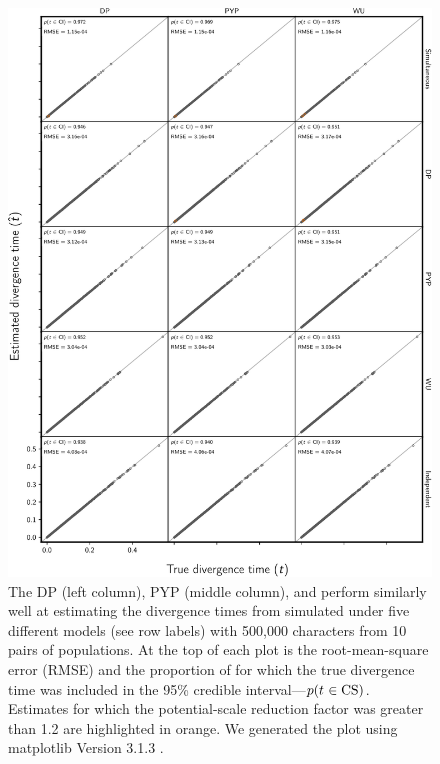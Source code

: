 \begin{figure}[htbp]
    \begin{center}
        \includegraphics[width=\textwidth,height=0.9\textheight,keepaspectratio]{../images/from-project-repo/infer-columns-by-data-rows-div-time-scatter-cropped.pdf}
        \captionsetup{name=Figure S, labelformat=noSpace, listformat=sFigList}
        \caption{\footnotesize
        The DP (left column),
        PYP (middle column),
        and
        \wunif
        perform similarly well at estimating the divergence times from
        \datasets simulated under five different models (see row labels) with
        500,000 characters from 10 pairs of populations.
        At the top of each plot is the root-mean-square error (RMSE)
        and
        the proportion of \datasets for which the true divergence time was
        included in the 95\% credible interval---$p(t_{} \in
        \textrm{CS})$.
        Estimates for which the potential-scale reduction factor was greater
        than 1.2 \citep{Brooks1998} are highlighted in orange.
        We generated the plot using matplotlib Version 3.1.3
        \citep{matplotlib}.
        }
        \label{fig:divtimegrid}
    \end{center}
\end{figure}

